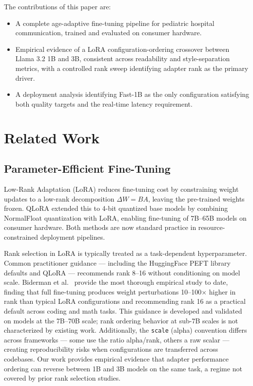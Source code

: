 \documentclass[journal]{IEEEtai}
\begin{document}
\medskip\noindent The contributions of this paper are:
\begin{itemize}
    \item A complete age-adaptive fine-tuning pipeline for pediatric hospital communication, trained and evaluated on consumer hardware.
    \item Empirical evidence of a LoRA configuration-ordering crossover between Llama 3.2 1B and 3B, consistent across readability and style-separation metrics, with a controlled rank sweep identifying adapter rank as the primary driver.
    \item A deployment analysis identifying Fast-1B as the only configuration satisfying both quality targets and the real-time latency requirement.
\end{itemize}

\section{Related Work}

\subsection{Parameter-Efficient Fine-Tuning}

Low-Rank Adaptation (LoRA) \cite{hu2022lora} reduces fine-tuning cost by constraining weight updates to a low-rank decomposition $\Delta W = BA$, leaving the pre-trained weights frozen. QLoRA \cite{dettmers2023qlora} extended this to 4-bit quantized base models by combining NormalFloat quantization with LoRA, enabling fine-tuning of 7B--65B models on consumer hardware. Both methods are now standard practice in resource-constrained deployment pipelines.

Rank selection in LoRA is typically treated as a task-dependent hyperparameter. Common practitioner guidance --- including the HuggingFace PEFT library defaults and QLoRA \cite{dettmers2023qlora} --- recommends rank 8--16 without conditioning on model scale. Biderman et al.~\cite{biderman2024lora} provide the most thorough empirical study to date, finding that full fine-tuning produces weight perturbations 10--100$\times$ higher in rank than typical LoRA configurations and recommending rank 16 as a practical default across coding and math tasks. This guidance is developed and validated on models at the 7B--70B scale; rank ordering behavior at sub-7B scales is not characterized by existing work. Additionally, the \texttt{scale} (alpha) convention differs across frameworks --- some use the ratio alpha/rank, others a raw scalar --- creating reproducibility risks when configurations are transferred across codebases. Our work provides empirical evidence that adapter performance ordering can reverse between 1B and 3B models on the same task, a regime not covered by prior rank selection studies.
\end{document}
